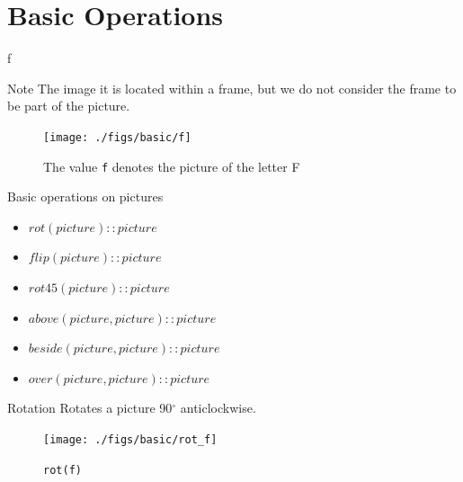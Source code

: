 \documentclass{beamer}
\begin{document}


    \section{Basic Operations}

    \begin{frame}{f}
        \begin{alertblock}{Note}
        The image it is located within a frame, but we do not consider the frame to be part of the picture.
        \end{alertblock}

        \begin{figure}
            \centering
            \texttt{[image: ./figs/basic/f]}
            \caption{\footnotesize The value \texttt{f} denotes the picture of the letter F}
            \label{fig:f}
        \end{figure}

    \end{frame}

    \begin{frame}{Basic operations on pictures}

        \begin{itemize}
            \item $rot(picture) :: picture$
            \item $flip(picture) :: picture$
            \item $rot45(picture) :: picture$
            \item $above(picture, picture) :: picture$
            \item $beside(picture, picture) :: picture$
            \item $over(picture, picture) :: picture$
        \end{itemize}

    \end{frame}

    \begin{frame}{Rotation}
        Rotates a picture 90$^{\circ}$ anticlockwise.

        \begin{figure}
            \centering
            \texttt{[image: ./figs/basic/rot\_f]}
            \caption{\texttt{rot(f)}}
            \label{fig:rot_f}
        \end{figure}
    \end{frame}
\end{document}
